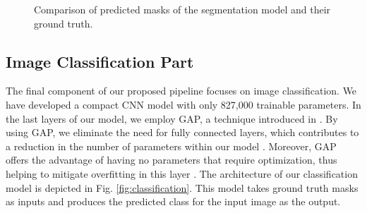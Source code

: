 \documentclass[conference]{IEEEtran}
\begin{document}
\begin{figure}[t] 
\caption{Comparison of predicted masks of the segmentation model and their ground truth.}
\label{fig:unet-results}
\end{figure}  

 \subsection{Image Classification Part}
The final component of our proposed pipeline focuses on image classification. We have developed a compact CNN model with only 827,000 trainable parameters.
In the last layers of our model, we employ GAP, a technique introduced in \cite{18}. By using GAP, we eliminate the need for fully connected layers, which contributes to a reduction in the number of parameters within our model \cite{18}. Moreover, GAP offers the advantage of having no parameters that require optimization, thus helping to mitigate overfitting in this layer \cite{18}.
The architecture of our classification model is depicted in Fig. \ref{fig:classification}. This model takes ground truth masks as inputs and produces the predicted class for the input image as the output.


\begin{figure*}[t] 
\caption{The architecture of the classification model includes the relationship of layers, the number of output filters in the convolution layers, and the type of other layers.}
\label{fig:classification}
\end{figure*}  
\end{document}
